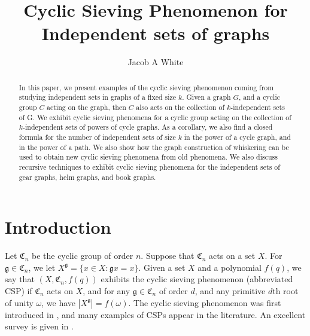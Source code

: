 \documentclass[12pt]{article}
\title{Cyclic Sieving Phenomenon for Independent sets of graphs}
\author{Jacob A White}
\theoremstyle{definition}
\begin{document}
\maketitle

\begin{abstract}
In this paper, we present examples of the cyclic sieving phenomenon coming from studying independent sets in graphs of a fixed size $k$. Given a graph $G$, and a cyclic group $C$ acting on the graph, then $C$ also acts on the collection of $k$-independent sets of G.
We exhibit cyclic sieving phenomena for a cyclic group acting on the collection of $k$-independent sets of powers of cycle graphs. As a corollary, we also find a closed formula for the number of independent sets of size $k$ in the power of a cycle graph, and in the power of a path. We also show how the graph construction of whiskering can be used to obtain new cyclic sieving phenomena from old phenomena. We also discuss recursive techniques to exhibit cyclic sieving phenomena for the independent sets of gear graphs, helm graphs, and book graphs. 
\end{abstract}

\section{Introduction}




Let $\mathfrak{C}_n$ be the cyclic group of order $n.$ Suppose that $\mathfrak{C}_n$ acts on a set $X$. For $\mathfrak{g} \in \mathfrak{C}_n$, we let $X^{\mathfrak{g}} = \{x \in X: \mathfrak{g}x=x \}.$
Given a set $X$ and a polynomial $f(q)$, we say that $(X, \mathfrak{C}_n, f(q))$ exhibits the cyclic sieving phenomenon (abbreviated CSP) if $\mathfrak{C}_n$ acts on $X$, and for any $\mathfrak{g} \in \mathfrak{C}_n$ of order $d$, and any primitive $d$th root of unity $\omega$, we have $|X^{\mathfrak{g}}| = f(\omega)$. The cyclic sieving phenomenon was first introduced in \cite{CSP1}, and many examples of CSPs appear in the literature. An excellent survey is given in \cite{CSP2}.
\end{document}
